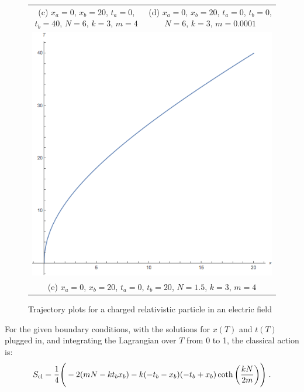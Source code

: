 \documentclass[12pt]{revtex4}
\begin{document}
\begin{figure}
\begin{tabular} {cc}
		(c) $x_a=0$, $x_b=20$, $t_a=0$, $t_b=40$, $N=6$, $k=3$, $m=4$  & (d) $x_a=0$, $x_b=20$, $t_a=0$, $t_b=0$, $N=6$, $k=3$, $m=0.0001$ \\[6pt]
		\multicolumn{2}{c}{\includegraphics[width=0.4\linewidth]{schwinger5} }\\
		\multicolumn{2}{c}{(e) $x_a=0$, $x_b=20$, $t_a=0$, $t_b=20$, $N=1.5$, $k=3$, $m=4$}
	\end{tabular}
	\caption{Trajectory plots for a charged relativistic particle in an electric field}
	\label{fig:trajects}
\end{figure}

For the given boundary conditions, with the solutions for $x(T)$ and $t(T)$ plugged in, and integrating the Lagrangian over $T$ from 0 to 1, the classical action  is:
\begin{equation*}
S_{\rm cl} = \frac{1}{4} \Bigg(-2 (m N - k t_b x_b) - k (-t_b - x_b) (-t_b + x_b) \coth\bigg(\frac{k N}{2 m}\bigg)\Bigg) \; .
\end{equation*} 
\end{document}
